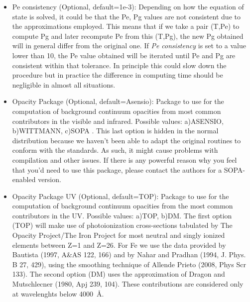 \begin{itemize}
\item Pe consistency (Optional, default=1e-3): Depending on how the
  equation of state is solved, it could be that the Pe, Pg values are
  not consistent due to the approximations employed. This means that
  if we take a pair (T,Pe) to compute Pg and later recompute Pe from
  this (T,Pg), the new Pg obtained will in general differ from the
  original one. If {\em Pe consistency} is set to a value lower than
  10, the Pe value obtained will be iterated until Pe and Pg are
  consistent within that tolerance. In principle this could slow down
  the procedure but in practice the difference in computing time
  should be negligible in almost all situations.
\item Opacity Package (Optional, default=Asensio): Package to use for
  the computation of background continuum opacities from most common
  contributors in the visible and infrared. Possible values:
  a)ASENSIO, b)WITTMANN, c)SOPA . This last option is hidden in the
  normal distribution because we haven't been able to adapt the
  original routines to conform with the standards. As such, it might
  cause problems with compilation and other issues. If there is any
  powerful reason why you feel that you'd need to use this package,
  please contact the authors for a SOPA-enabled version.
\item Opacity Package UV (Optional, default=TOP): Package to use for
  the computation of background continuum opacities from the most common
  contributors in the UV. Possible values: a)TOP, b)DM. The first
  option (TOP) will make use of photoionization cross-sections
  tabulated by The Opacity Project/The Iron Project for most neutral
  and singly ionized elements between Z=1 and Z=26. For Fe we use the
  data provided by Bautista (1997, A\&AS 122, 166) and by Nahar and
  Pradhan (1994, J. Phys. B 27, 429), using the smoothing technique of
  Allende Prieto (2008, Phys Scr 133). The second option (DM) uses the
  approximation of Dragon and Mutschlecner (1980, Apj 239, 104). These
  contributions are considered only at wavelenghts below 4000~\AA .

\end{itemize}
